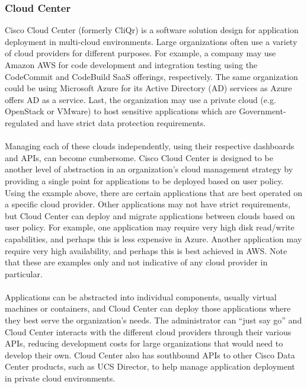 \subsubsection{Cloud Center}
Cisco Cloud Center (formerly CliQr) is a software solution design for
application deployment in multi-cloud environments. Large organizations often
use a variety of cloud providers for different purposes. For example, a
company may use Amazon AWS for code development and integration testing using
the CodeCommit and CodeBuild SaaS offerings, respectively. The same
organization could be using Microsoft Azure for its Active Directory (AD)
services as Azure offers AD as a service. Last, the organization may use a
private cloud (e.g. OpenStack or VMware) to host sensitive applications which
are Government-regulated and have strict data protection requirements.
\\ \\
Managing each of these clouds independently, using their respective dashboards
and APIs, can become cumbersome. Cisco Cloud Center is designed to be another
level of abstraction in an organization's cloud management strategy by
providing a single point for applications to be deployed based on user policy.
Using the example above, there are certain applications that are best operated
on a specific cloud provider. Other applications may not have strict
requirements, but Cloud Center can deploy and migrate applications between
clouds based on user policy. For example, one application may require very
high disk read/write capabilities, and perhaps this is less expensive in
Azure. Another application may require very high availability, and perhaps
this is best achieved in AWS. Note that these are examples only and not
indicative of any cloud provider in particular.
\\ \\
Applications can be abstracted into individual components, usually virtual
machines or containers, and Cloud Center can deploy those applications where
they best serve the organization's needs. The administrator can ``just say go''
and Cloud Center interacts with the different cloud providers through their
various APIs, reducing development costs for large organizations that would
need to develop their own. Cloud Center also has southbound APIs to other
Cisco Data Center products, such as UCS Director, to help manage application
deployment in private cloud environments.

